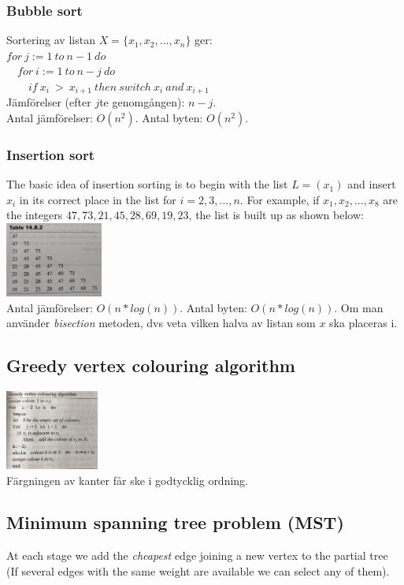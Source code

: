 \documentclass{article}
\begin{document}
\begin{multicols}{2}
\subsubsection{Bubble sort}
Sortering av listan $X = \{x_1,x_2,...,x_n\}$ ger:\\
$for \ j:=1 \ to \ n-1 \ do$\\
$\quad for \ i:=1 \ to \ n-j \ do$\\
$\quad \quad if \ x_i \ > \ x_{i+1} \ then \ switch \ x_i \ and \ x_{i+1}$\\
\newline
Jämförelser (efter $j$te genomgången): $n-j$.\\
Antal jämförelser: $O(n^2)$. Antal byten: $O(n^2)$. 

\subsubsection{Insertion sort}
The basic idea of insertion sorting is to begin with the list $L=(x_1)$ and insert $x_i$ in its correct place in the list for $i =2,3,...,n$. For example, if $x_1,x_2,...,x_8$ are the integers $47,73,21,45,28,69,19,23$, the list is built up as shown below:\\
\includegraphics[width=0.24\textwidth]{images/insertion}\\
Antal jämförelser: $O(n*log(n))$. Antal byten: $O(n*log(n))$. Om man använder \textit{bisection} metoden, dvs veta vilken halva av listan som $x$ ska placeras i.

\subsection{Greedy vertex colouring algorithm}
\includegraphics[width=0.23\textwidth]{images/color_alg}\\
Färgningen av kanter får ske i godtycklig ordning.

\subsection{Minimum spanning tree problem (MST)}
At each stage we add the \textit{cheapest} edge joining a new vertex to the partial tree (If several edges with the same weight are available we can select any of them).


\end{multicols}
\end{document}
